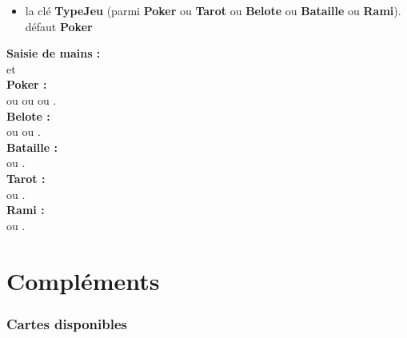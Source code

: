 \documentclass{article}
\newcommand\Cle[1]{{\bfseries\sffamily\textlangle #1\textrangle}}
\begin{document}
{{{{{{{\begin{codecles}
\begin{itemize}
	\item la clé \Cle{TypeJeu} (parmi \Cle{Poker} ou \Cle{Tarot} ou \Cle{Belote} ou \Cle{Bataille} ou \Cle{Rami}). \hfill{}défaut \Cle{Poker}
\end{itemize}
\end{codecles}

\begin{codetex}[]
\textbf{\large Saisie de mains : }\\
 et~
\\

\textbf{\large Poker : }\\
 ou  ou  ou .\\

\textbf{\large Belote :}\\
 ou  ou .\\

\textbf{\large Bataille : }\\
 ou .\\

\textbf{\large Tarot : }\\
 ou .\\

\textbf{\large Rami : }\\
 ou .
\end{codetex}

\pagebreak

\part{Compléments}

\section{Cartes disponibles}

}}}}}}}
\end{document}
